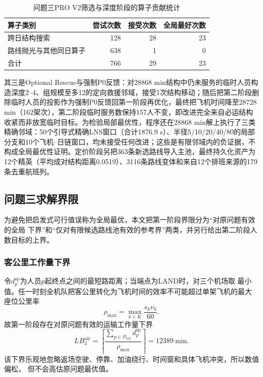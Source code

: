 \documentclass[UTF8,a4paper,zihao=5]{ctexart}
\begin{document}
\begin{table}[htbp]
  \centering
  \caption{问题三PRO V2筛选与深度阶段的算子贡献统计}
  \label{tab:q3-operator-v2}
  \begin{tabular}{lrrr}
    \toprule
    算子类别 & 尝试次数 & 接受次数 & 全局最好次数 \\
    \midrule
    跨日结构搜索 & 128 & 28 & 23 \\
    路线抛光与其他同日算子 & 638 & 1 & 0 \\
    \midrule
    合计 & 766 & 29 & 23 \\
    \bottomrule
  \end{tabular}
\end{table}

其三是Optional Rescue与强制P0反馈：对28868 min结构中仍未服务的临时人员构造深度2--4、组规模至多12的定向救援邻域，接受1次结构移动；随后把第二阶段删除临时人员的投影作为强制P0反馈回第一阶段再优化，最终把飞机时间降至28728 min（162架次），第二阶段临时服务数保持157人不变，即改进完全来自必运结构收紧而非放宽临时目标。为检验局部最优性，程序还在28868 min解上执行了三类精确邻域：50个引导式精确LNS窗口（合计1876.9 s）、半径5/10/20/40/80的局部分支和10个飞机--日链窗口，均未接受任何改进；这些是有限邻域内的负证据，不构成全局最优性证明。定价阶段另把363条新选路线导入主池，最终持久化资产为12个精英（平均成对结构距离0.0519）、3116条路线变体和来自12个排班来源的179条去重航班列。

\subsection{问题三求解界限}

为避免把启发式可行值误称为全局最优，本文把第一阶段界限分为“对原问题有效的全局
下界”和“仅对有限候选路线池有效的参考界”两类，并另行给出第二阶段人数目标的上界。

\subsubsection{客公里工作量下界}

令$d_p^{\mathrm{sp}}$为人员$p$起终点之间的最短路距离；当端点为LAND时，对三个机场取
最小值。任一时刻全机队把客公里转化为飞机时间的效率不可能超过单架飞机的最大
座位公里率
\begin{equation}
  \rho_{\max}=\max_{k\in K}\frac{s_k\nu_k}{60}.
  \label{eq:q3-seat-km-rate}
\end{equation}
故第一阶段存在对原问题有效的运输工作量下界
\begin{equation}
  LB_3^{\mathrm{air}}
  =\left\lceil
  \frac{\sum_{p\in P_{\mathrm{req}}}d_p^{\mathrm{sp}}}{\rho_{\max}}
  \right\rceil=12389\ \mathrm{min}.
  \label{eq:q3-aircraft-time-lb}
\end{equation}
该下界乐观地忽略返场空驶、停靠、加油绕行、时间窗和具体飞机冲突，所以数值偏松，
但不会高估原问题最优值。
\end{document}
